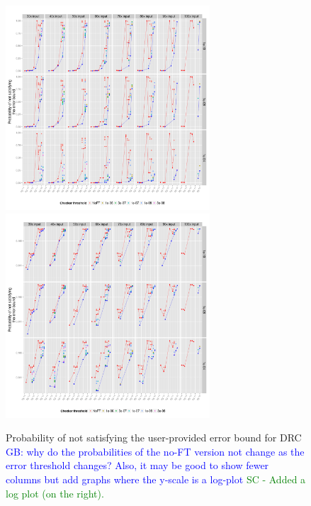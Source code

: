 \documentclass{sig-alternate}
\newcommand{\sui}[1]{%
  \textcolor{green}{SC - #1}
}
\newcommand{\greg}[1]{%
  \textcolor{blue}{GB: #1}
}
\begin{document}
\begin{figure}[ht!]
\centering
\includegraphics[height=3in]{figs/DRC_ImperfectRate.png}
\includegraphics[height=3in]{figs/DRC_ImperfectRate_log.png}
\caption{Probability of not satisfying the user-provided error bound for DRC \greg{why do the probabilities of the no-FT version not change as the error threshold changes? Also, it may be good to show fewer columns but add graphs where the y-scale is a log-plot} \sui{Added a log plot (on the right).}}
\label{fig:DRC_ImperfectRate}
\end{figure}
\end{document}
